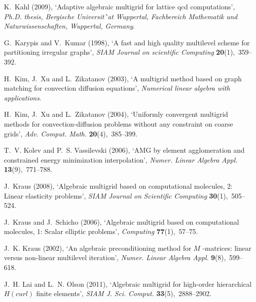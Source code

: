 \documentclass[12pt]{acta_2011xz}
\begin{document}
\begin{thebibliography}{xx}
K.~Kahl  (2009), `Adaptive algebraic multigrid for lattice qcd computations',
  {\em Ph.D. thesis, Bergische Universit\``at Wuppertal, Fachbereich Mathematik
  und Naturwissenschaften, Wuppertal, Germany}.

G.~Karypis and V.~Kumar  (1998), `{A fast and high quality multilevel scheme
  for partitioning irregular graphs}', {\em SIAM Journal on scientific
  Computing} {\bf 20}(1),~359--392.

H.~Kim, J.~Xu and L.~Zikatanov  (2003), `{A multigrid method based on graph
  matching for convection diffusion equations}', {\em Numerical linear algebra
  with applications}.

H.~Kim, J.~Xu and L.~Zikatanov  (2004), `Uniformly convergent multigrid methods
  for convection-diffusion problems without any constraint on coarse grids',
  {\em Adv. Comput. Math.} {\bf 20}(4),~385--399.

T.~V. Kolev and P.~S. Vassilevski  (2006), `A{MG} by element agglomeration and
  constrained energy minimization interpolation', {\em Numer. Linear Algebra
  Appl.} {\bf 13}(9),~771--788.

J.~Kraus  (2008), `Algebraic multigrid based on computational molecules, 2:
  Linear elasticity problems', {\em SIAM Journal on Scientific Computing} {\bf
  30}(1),~505--524.

J.~Kraus and J.~Schicho  (2006), `Algebraic multigrid based on computational
  molecules, 1: Scalar elliptic problems', {\em Computing} {\bf 77}(1),~57--75.

J.~K. Kraus  (2002), `An algebraic preconditioning method for {        $M$        }-matrices:
  linear versus non-linear multilevel iteration', {\em Numer. Linear Algebra
  Appl.} {\bf 9}(8),~599--618.

J.~H. Lai and L.~N. Olson  (2011), `Algebraic multigrid for high-order
  hierarchical {        $H(curl)$        } finite elements', {\em SIAM J. Sci. Comput.} {\bf
  33}(5),~2888--2902.


\end{thebibliography}
\end{document}
